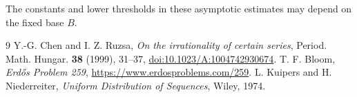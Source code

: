 \documentclass[11pt]{article}
\begin{document}
The constants and lower thresholds in these asymptotic estimates
may depend on the fixed base $B$.

\begin{thebibliography}{9}
 Y.-G. Chen and I. Z. Ruzsa,
\emph{On the irrationality of certain series},
Period. Math. Hungar. \textbf{38} (1999), 31--37,
\href{https://doi.org/10.1023/A:1004742930674}{doi:10.1023/A:1004742930674}.
 T. F. Bloom, \emph{Erd\H{o}s Problem 259},
\url{https://www.erdosproblems.com/259}.
 L. Kuipers and H. Niederreiter,
\emph{Uniform Distribution of Sequences}, Wiley, 1974.
\end{thebibliography}
\end{document}
